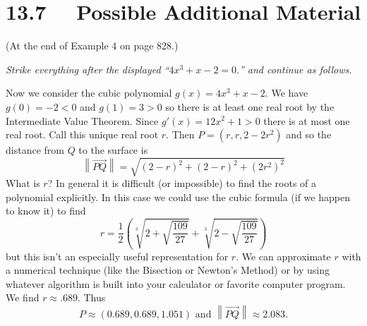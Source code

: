 \section*{13.7 \ \  Possible Additional Material}

(At the end of Example 4 on page 828.)

\emph{Strike everything after the displayed ``$4x^3 + x - 2 = 0.$'' and continue as follows.}

Now we consider the cubic polynomial $g(x) = 4x^3 + x - 2$.  We have $g(0) = -2 < 0$ and $g(1) = 3 > 0$ so there is at least one real root by the Intermediate Value Theorem.  Since $g'(x) = 12x^2 + 1 > 0$ there is at most one real root.  Call this unique real root $r$.  Then $P = (r, r, 2 - 2r^2)$ and so the distance from $Q$ to the surface is
\[
\left\| \overrightarrow{PQ} \right\| = \sqrt{(2-r)^2 + (2-r)^2 + (2r^2)^2}
\]
What is $r$?  In general it is difficult (or impossible) to find the roots of a polynomial explicitly.  In this case we could use the cubic formula (if we happen to know it) to find
\[
r = \frac{1}{2} \left( \sqrt[3]{ 2 + \sqrt{\frac{109}{27}} } + \sqrt[3]{ 2 - \sqrt{\frac{109}{27}} } \right)
\]
but this isn't an especially useful representation for $r$.  
We can approximate $r$ with a numerical technique (like the Bisection or Newton's Method) or by using whatever algorithm is built into your calculator or favorite computer program.  We find $r \approx .689$.  Thus
\[
P \approx (0.689, 0.689, 1.051) \text{ and } \left\| \overrightarrow{PQ} \right\| \approx 2.083.
\]



\ 

